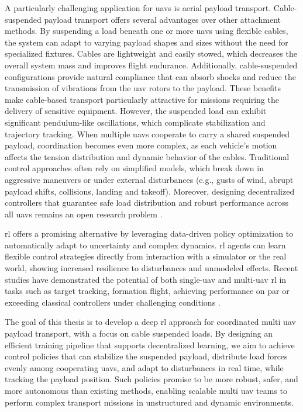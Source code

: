 A particularly challenging application for \glspl{uav} is aerial payload transport. Cable-suspended payload transport offers several advantages over other attachment methods. By suspending a load beneath one or more \glspl{uav} using flexible cables, the system can adapt to varying payload shapes and sizes without the need for specialized fixtures. Cables are lightweight and easily stowed, which decreases the overall system mass and improves flight endurance. Additionally, cable-suspended configurations provide natural compliance that can absorb shocks and reduce the transmission of vibrations from the \gls{uav} rotors to the payload. These benefits make cable-based transport particularly attractive for missions requiring the delivery of sensitive equipment. However, the suspended load can exhibit significant pendulum-like oscillations, which complicate stabilization and trajectory tracking. When multiple \glspl{uav} cooperate to carry a shared suspended payload, coordination becomes even more complex, as each vehicle's motion affects the tension distribution and dynamic behavior of the cables. Traditional control approaches often rely on simplified models, which break down in aggressive maneuvers or under external disturbances (e.g., gusts of wind, abrupt payload shifts, collisions, landing and takeoff). Moreover, designing decentralized controllers that guarantee safe load distribution and robust performance across all \glspl{uav} remains an open research problem \cite{estevez_review_2024}.

\gls{rl} offers a promising alternative by leveraging data-driven policy optimization to automatically adapt to uncertainty and complex dynamics. \gls{rl} agents can learn flexible control strategies directly from interaction with a simulator or the real world, showing increased resilience to disturbances and unmodeled effects. Recent studies have demonstrated the potential of both single-\gls{uav} and multi-\gls{uav} \gls{rl} in tasks such as target tracking, formation flight, achieving performance on par or exceeding classical controllers under challenging conditions \autocite{Hwangbo2017ControlOAA, kaufmann_champion-level_2023, Song2023ReachingTL, huang_collision_2024,eschmann_learning_2024-1}.

The goal of this thesis is to develop a deep \gls{rl} approach for coordinated multi \gls{uav} payload transport, with a focus on cable suspended loads. By designing an efficient training pipeline that supports decentralized learning, we aim to achieve control policies that can stabilize the suspended payload, distribute load forces evenly among cooperating \glspl{uav}, and adapt to disturbances in real time, while tracking the payload position. Such policies promise to be more robust, safer, and more autonomous than existing methods, enabling scalable multi \gls{uav} teams to perform complex transport missions in unstructured and dynamic environments.

